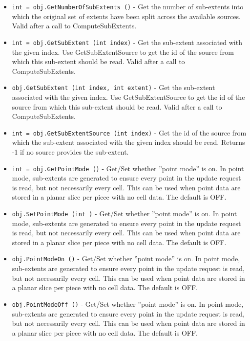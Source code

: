 \begin{itemize}
\item  \verb|int = obj.GetNumberOfSubExtents ()| -  Get the number of sub-extents into which the original set of
 extents have been split across the available sources.  Valid
 after a call to ComputeSubExtents.

\item  \verb|int = obj.GetSubExtent (int index)| -  Get the sub-extent associated with the given index.  Use
 GetSubExtentSource to get the id of the source from which this
 sub-extent should be read.  Valid after a call to
 ComputeSubExtents.

\item  \verb|obj.GetSubExtent (int index, int extent)| -  Get the sub-extent associated with the given index.  Use
 GetSubExtentSource to get the id of the source from which this
 sub-extent should be read.  Valid after a call to
 ComputeSubExtents.

\item  \verb|int = obj.GetSubExtentSource (int index)| -  Get the id of the source from which the sub-extent associated
 with the given index should be read.  Returns -1 if no source
 provides the sub-extent.

\item  \verb|int = obj.GetPointMode ()| -  Get/Set whether ''point mode'' is on.  In point mode, sub-extents
 are generated to ensure every point in the update request is
 read, but not necessarily every cell.  This can be used when
 point data are stored in a planar slice per piece with no cell
 data.  The default is OFF.

\item  \verb|obj.SetPointMode (int )| -  Get/Set whether ''point mode'' is on.  In point mode, sub-extents
 are generated to ensure every point in the update request is
 read, but not necessarily every cell.  This can be used when
 point data are stored in a planar slice per piece with no cell
 data.  The default is OFF.

\item  \verb|obj.PointModeOn ()| -  Get/Set whether ''point mode'' is on.  In point mode, sub-extents
 are generated to ensure every point in the update request is
 read, but not necessarily every cell.  This can be used when
 point data are stored in a planar slice per piece with no cell
 data.  The default is OFF.

\item  \verb|obj.PointModeOff ()| -  Get/Set whether ''point mode'' is on.  In point mode, sub-extents
 are generated to ensure every point in the update request is
 read, but not necessarily every cell.  This can be used when
 point data are stored in a planar slice per piece with no cell
 data.  The default is OFF.

\end{itemize}
